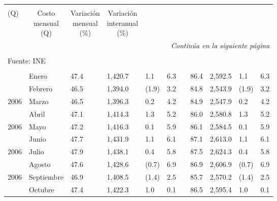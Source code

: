 \begin{center}
\begin{longtable}{llp{1.1cm}p{1.2cm}p{1.2cm}p{1.2cm}rp{1.2cm}p{1.2cm}p{1.2cm}p{1.2cm}}
{{				\\(Q)}} &  \multicolumn{1}{c}{\small\parbox{1.2cm}{Costo\\ mensual \\(Q)}} &\multicolumn{1}{c}{\small\parbox{1.2cm}{Variación\\ mensual\\(\%)}} & \multicolumn{1}{c}{\small\parbox{1.2cm}{Variación\\ interanual\\(\%)}}\\	[.5cm]					     
		\hline\endhead
		\hline \multicolumn{11}{r}{\textit{Continúa en la siguiente página}} \\
		\endfoot
		&&&&&&&&&& \\[-0.4cm]
		\multicolumn{11}{l}{\footnotesize Fuente: INE}\\
		\endlastfoot
		\rowcolor{color1!0!white}    &&&&&&&&&& \\[-0.35cm]
		\rowcolor{color1!0!white}\multicolumn{1}{l}{2006} &	Enero	&	 47.4 	&	 1,420.7 	&	 1.1 	&	 6.3 	&  &	 86.4 	&	 2,592.5 	&	 1.1 	&	 6.3 	\\
		\rowcolor{color1!5!white}\multicolumn{1}{l}{	2006	}&	Febrero	&	 46.5 	&	 1,394.0 	&	 (1.9)	&	 3.2 	&  &	 84.8 	&	 2,543.9 	&	 (1.9)	&	 3.2 	\\
		\multicolumn{1}{l}{	2006	}&	Marzo	&	 46.5 	&	 1,396.3 	&	 0.2 	&	 4.2 	&  &	 84.9 	&	 2,547.9 	&	 0.2 	&	 4.2 	\\
		\rowcolor{color1!5!white}\multicolumn{1}{l}{	2006	}&	Abril	&	 47.1 	&	 1,414.3 	&	 1.3 	&	 5.2 	&  &	 86.0 	&	 2,580.8 	&	 1.3 	&	 5.2 	\\
		\multicolumn{1}{l}{	2006	}&	Mayo	&	 47.2 	&	 1,416.3 	&	 0.1 	&	 5.9 	&  &	 86.1 	&	 2,584.5 	&	 0.1 	&	 5.9 	\\
		\rowcolor{color1!5!white}\multicolumn{1}{l}{	2006	}&	Junio	&	 47.7 	&	 1,431.9 	&	 1.1 	&	 6.1 	&  &	 87.1 	&	 2,613.0 	&	 1.1 	&	 6.1 	\\
		\multicolumn{1}{l}{	2006	}&	Julio	&	 47.9 	&	 1,438.1 	&	 0.4 	&	 5.8 	&  &	 87.5 	&	 2,624.3 	&	 0.4 	&	 5.8 	\\
		\rowcolor{color1!5!white}\multicolumn{1}{l}{	2006	}&	Agosto	&	 47.6 	&	 1,428.6 	&	 (0.7)	&	 6.9 	&  &	 86.9 	&	 2,606.9 	&	 (0.7)	&	 6.9 	\\
		\multicolumn{1}{l}{	2006	}&	Septiembre	&	 46.9 	&	 1,408.5 	&	 (1.4)	&	 2.5 	&  &	 85.7 	&	 2,570.2 	&	 (1.4)	&	 2.5 	\\
		\rowcolor{color1!5!white}\multicolumn{1}{l}{	2006	}&	Octubre	&	 47.4 	&	 1,422.3 	&	 1.0 	&	 0.1 	&  &	 86.5 	&	 2,595.4 	&	 1.0 	&	 0.1 	\\

\end{longtable}
\end{center}

